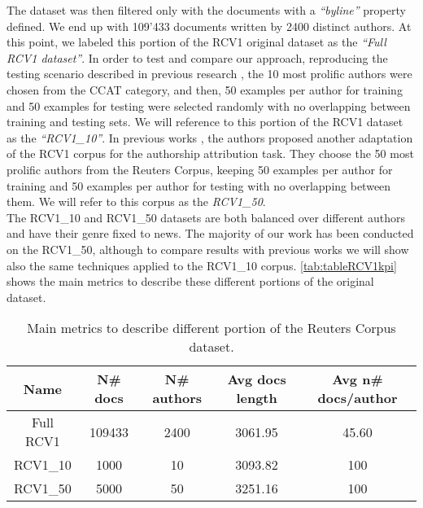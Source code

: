 The dataset was then filtered only with the documents with a \textit{\enquote{byline}} property defined. We end up with 109'433 documents written by 2400 distinct authors. At this point, we labeled this portion of the RCV1 original dataset as the \textit{\enquote{Full RCV1 dataset}}.
In order to test and compare our approach, reproducing the testing scenario
described in previous research \cite{stamatatos2009survey}, the 10 most prolific authors were chosen from the CCAT category, and then, 50 examples per author for training and 50 examples for testing were selected randomly with no overlapping between training and testing sets. We will reference to this portion of the RCV1 dataset as the \textit{\enquote{RCV1\_10}}.
In previous works \cite{houvardas2006n}, the authors proposed another adaptation of the RCV1 corpus for the authorship attribution task. They choose the 50 most prolific authors from the Reuters Corpus, keeping 50 examples per author for training and 50 examples per author for testing with no
overlapping between them. We will refer to this corpus as the \textit{RCV1\_50}.\\
The RCV1\_10 and RCV1\_50 datasets are both balanced over different authors and have their genre fixed to news.
The majority of our work has been conducted on the RCV1\_50, although to compare results with previous works we will show also the same techniques applied to the RCV1\_10 corpus.
\autoref{tab:tableRCV1kpi} shows the main metrics to describe these different portions of the original dataset.

\begin{table}[h!]
	\begin{center}  
		\caption[Reuters Corpus metrics]{Main metrics to describe different portion of the Reuters Corpus dataset.} 
		\label{tab:tableRCV1kpi}
		\begin{tabular}{|c | c | c | c | c |}
			\hline 
			Name & N\# docs & N\# authors & Avg docs length & Avg n\# docs/author \\
			\hline
			Full RCV1 & 109433 & 2400 & 3061.95 & 45.60 \\ \hline
			RCV1\_10 & 1000 & 10 & 3093.82 & 100  \\ \hline
			RCV1\_50 & 5000 & 50 & 3251.16 & 100  \\ \hline
		\end{tabular} 
	\end{center}
\end{table}

